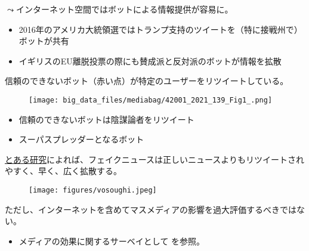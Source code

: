 \documentclass[
  xelatex,
  ja=standard]{bxjsarticle}
\providecommand{\tightlist}{%
  \setlength{\itemsep}{0pt}\setlength{\parskip}{0pt}}\usepackage{longtable,booktabs,array}
\begin{document}
\(\leadsto\)インターネット空間ではボットによる情報提供が容易に\citep{lazer2009, ferrara2016}。

\begin{itemize}
\tightlist
\item
  2016年のアメリカ大統領選ではトランプ支持のツイートを（特に接戦州で）ボットが共有
\item
  イギリスのEU離脱投票の際にも賛成派と反対派のボットが情報を拡散
\end{itemize}

信頼のできないボット（赤い点）が特定のユーザーをリツイートしている。

\begin{figure}[htpb]

{\centering \texttt{[image: big\_data\_files/mediabag/42001\_2021\_139\_Fig1\_.png]}

}

\caption{\citet{xu2022}}

\end{figure}

\begin{itemize}
\tightlist
\item
  信頼のできないボットは陰謀論者をリツイート
\item
  スーパスプレッダーとなるボット
\end{itemize}

\href{https://www.natureasia.com/ja-jp/ndigest/v15/n5/\%E3\%83\%95\%E3\%82\%A7\%E3\%82\%A4\%E3\%82\%AF\%E3\%83\%8B\%E3\%83\%A5\%E3\%83\%BC\%E3\%82\%B9\%E3\%81\%AF\%E9\%80\%9F\%E3\%81\%8F\%E5\%BA\%83\%E3\%81\%8F\%E4\%BC\%9D\%E3\%82\%8F\%E3\%82\%8B/92004}{とある研究}によれば、フェイクニュースは正しいニュースよりもリツイートされやすく、早く、広く拡散する。

\begin{figure}[htpb]

{\centering \texttt{[image: figures/vosoughi.jpeg]}

}

\caption{\citet{vosoughi2018}}

\end{figure}

ただし、インターネットを含めてマスメディアの影響を過大評価するべきではない。

\begin{itemize}
\tightlist
\item
  メディアの効果に関するサーベイとして \citet{inamasu2022} を参照。
\end{itemize}
\end{document}
